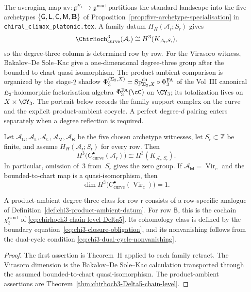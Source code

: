 The averaging map
$\mathrm{av}\colon\mathfrak g^{E_1}\to\mathfrak g^{\mathrm{mod}}$
partitions the standard landscape into the five archetypes
$\{\mathsf G,\mathsf L,\mathsf C,\mathsf M,\mathbf B\}$ of
Proposition~\ref{prop:five-archetype-specialisation} in
\texttt{chiral\_climax\_platonic.tex}.  A family datum
$H_H(\mathcal A_{\mathsf r};S_{\mathsf r})$ gives
\[
 \ChirHoch^3_{\mathrm{curve}}(\mathcal A_{\mathsf r})
 \cong H^3(K_{\mathcal A_{\mathsf r},S_{\mathsf r}}),
\]
so the degree-three column is determined row by row.  For the
Virasoro witness, Bakalov--De Sole--Kac give a one-dimensional
degree-three group after the bounded-to-chart quasi-isomorphism.
The product-ambient comparison is organized by the stage-$2$ shadow
$\Phi_3^{(\Sigma_2,X)} = \mathrm{Sp}^{\mathrm{ch}}_{\Sigma_2, X} \circ \Phi^{\mathrm{FA}}_3$ of the
Vol~III canonical $E_3$-holomorphic factorisation algebra
$\PhiFA_3(\cC)$ on $\CY_3$; its totalization lives on
$X\times\CY_3$.  The portrait below records the family support complex on the curve and
the explicit product-ambient cocycle.  A perfect degree-$d$ pairing
enters separately when a degree reflection is required.

\begin{theorem}
\label{thm:chirhoch3-five-archetype-portrait}
Let \(\mathcal A_{\mathsf G},\mathcal A_{\mathsf L},
\mathcal A_{\mathsf C},\mathcal A_{\mathsf M},
\mathcal A_{\mathsf B}\) be the five chosen archetype witnesses, let
$S_{\mathsf r}\subset\mathbb Z$ be finite, and assume
$H_H(\mathcal A_{\mathsf r};S_{\mathsf r})$ for every row.  Then
\[
 H^3\bigl(C^\bullet_{\mathrm{curve}}
 (\mathcal A_{\mathsf r})\bigr)
 \cong H^3(K_{\mathcal A_{\mathsf r},S_{\mathsf r}}).
\]
In particular, omission of~$3$ from~$S_{\mathsf r}$ gives the zero
group.  If $\mathcal A_{\mathsf M}=\operatorname{Vir}_c$ and the
bounded-to-chart map is a quasi-isomorphism, then
\[
 \dim H^3\bigl(C^\bullet_{\mathrm{curve}}
 (\operatorname{Vir}_c)\bigr)=1.
\]

A product-ambient degree-three class for row \(\mathsf r\) consists of
a row-specific analogue of
Definition~\ref{def:chi3-product-ambient-datum}.  For row \(\mathsf B\),
this is the cochain \(\chi_3^{\mathrm{cand}}\) of
\eqref{eq:chirhoch3-chain-level-Delta5}.  Its cohomology class is defined
by the boundary equation~\eqref{eq:chi3-closure-obligation}, and its
nonvanishing follows from the dual-cycle condition
\eqref{eq:chi3-dual-cycle-nonvanishing}.
\end{theorem}

\begin{proof}
The first assertion is Theorem~H applied to each family retract.  The
Virasoro dimension is the Bakalov--De Sole--Kac calculation transported
through the assumed bounded-to-chart quasi-isomorphism.  The
product-ambient assertions are
Theorem~\ref{thm:chirhoch3-Delta5-chain-level}.
\end{proof}

